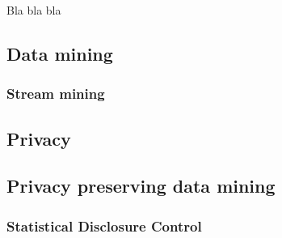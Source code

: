 Bla bla bla

\subsection{Data mining}

\subsubsection*{Stream mining}

\subsection{Privacy}

\subsection{Privacy preserving data mining}

\subsubsection*{Statistical Disclosure Control}
